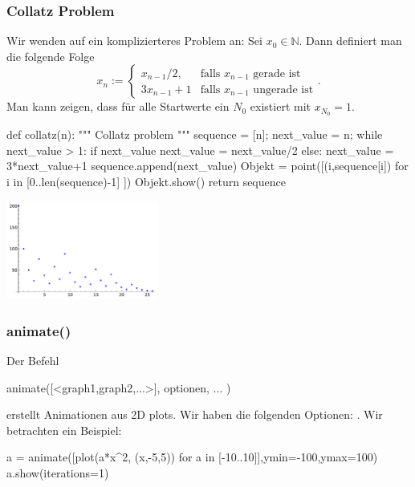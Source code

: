 \documentclass[fontsize=12pt,paper=a4,twoside,bibtotoc,idxtotoc,
liststotoc,pagesize,BCOR1.2cm,DIV15,chapterprefix,pagesize=pdftex]{scrbook}
\theoremstyle{plain}
\theoremstyle{definition}
\theoremstyle{remark}
\begin{document}
\subsubsection{Collatz Problem}
Wir wenden {\color{blue} } auf ein komplizierteres Problem an:
Sei $x_0\in \mathbb{N}$. Dann definiert man die folgende Folge
\[ x_n:= \left \{ \begin{array}{ll}
 x_{n-1}/2, & \mbox{falls } x_{n-1} \mbox{ gerade ist} \\
3x_{n-1}+1 & \mbox{falls } x_{n-1} \mbox{ ungerade ist} 
\end{array} \right. . \] 
Man kann zeigen, dass für alle Startwerte ein $N_0$ existiert mit $x_{N_0}=1$.

\begin{sagein}
def collatz(n):
    """ Collatz problem """
    sequence = [n]; next_value = n;
    while next_value > 1:
        if next_value %
            next_value = next_value/2
        else:
            next_value = 3*next_value+1
        sequence.append(next_value)
    Objekt = point([(i,sequence[i]) for i in [0..len(sequence)-1] ]) 
    Objekt.show()   
    return sequence
\end{sagein}
\begin{center}
\includegraphics[width=5cm]{collatz.pdf} 
\end{center}

\subsubsection{animate()}
Der Befehl 
\begin{sagein}
animate([<graph1,graph2,...>], optionen, ... ) 
\end{sagein}
erstellt Animationen aus 2D plots. Wir haben die folgenden Optionen: .
Wir betrachten ein Beispiel:
\begin{sagein}
a = animate([plot(a*x^2, (x,-5,5)) for a in [-10..10]],ymin=-100,ymax=100)
a.show(iterations=1)
\end{sagein}
\begin{center}
\end{center}
\end{document}
